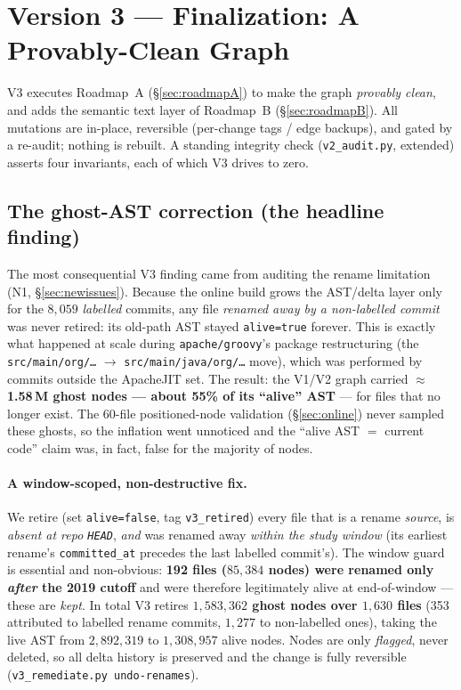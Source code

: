 \documentclass[11pt,a4paper]{article}
\newcommand{\code}[1]{\texttt{#1}}
\begin{document}
	\section{Version 3 --- Finalization: A Provably-Clean Graph}\label{sec:v3}
	V3 executes Roadmap~A (\S\ref{sec:roadmapA}) to make the graph \emph{provably
	clean}, and adds the semantic text layer of Roadmap~B (\S\ref{sec:roadmapB}). All
	mutations are in-place, reversible (per-change tags / edge backups), and gated by a
	re-audit; nothing is rebuilt. A standing integrity check
	(\texttt{v2\_audit.py}, extended) asserts four invariants, each of which V3 drives
	to zero.

	\subsection{The ghost-AST correction (the headline finding)}\label{sec:v3ghost}
	The most consequential V3 finding came from auditing the rename limitation (N1,
	\S\ref{sec:newissues}). Because the online build grows the AST/delta layer only for
	the $8{,}059$ \emph{labelled} commits, any file \emph{renamed away by a non-labelled
	commit} was never retired: its old-path AST stayed \code{alive=true} forever. This
	is exactly what happened at scale during \texttt{apache/groovy}'s package
	restructuring (the \texttt{src/main/org/\ldots} $\rightarrow$
	\texttt{src/main/java/org/\ldots} move), which was performed by commits outside the
	ApacheJIT set. The result: the V1/V2 graph carried \textbf{$\approx$1.58\,M ghost
	nodes --- about 55\% of its ``alive'' AST} --- for files that no longer exist. The
	60-file positioned-node validation (\S\ref{sec:online}) never sampled these ghosts,
	so the inflation went unnoticed and the ``alive AST $=$ current code'' claim was, in
	fact, false for the majority of nodes.

	\paragraph{A window-scoped, non-destructive fix.} We retire (set
	\code{alive=false}, tag \code{v3\_retired}) every file that is a rename \emph{source},
	is \emph{absent at repo \texttt{HEAD}}, \emph{and} was renamed away \emph{within the
	study window} (its earliest rename's \code{committed\_at} precedes the last labelled
	commit's). The window guard is essential and non-obvious: \textbf{192 files
	($85{,}384$ nodes) were renamed only \emph{after} the 2019 cutoff} and were therefore
	legitimately alive at end-of-window --- these are \emph{kept}. In total V3 retires
	\textbf{$1{,}583{,}362$ ghost nodes over $1{,}630$ files} (353 attributed to labelled
	rename commits, $1{,}277$ to non-labelled ones), taking the live AST from
	$2{,}892{,}319$ to \textbf{$1{,}308{,}957$} alive nodes. Nodes are only
	\emph{flagged}, never deleted, so all delta history is preserved and the change is
	fully reversible (\texttt{v3\_remediate.py undo-renames}).
\end{document}
